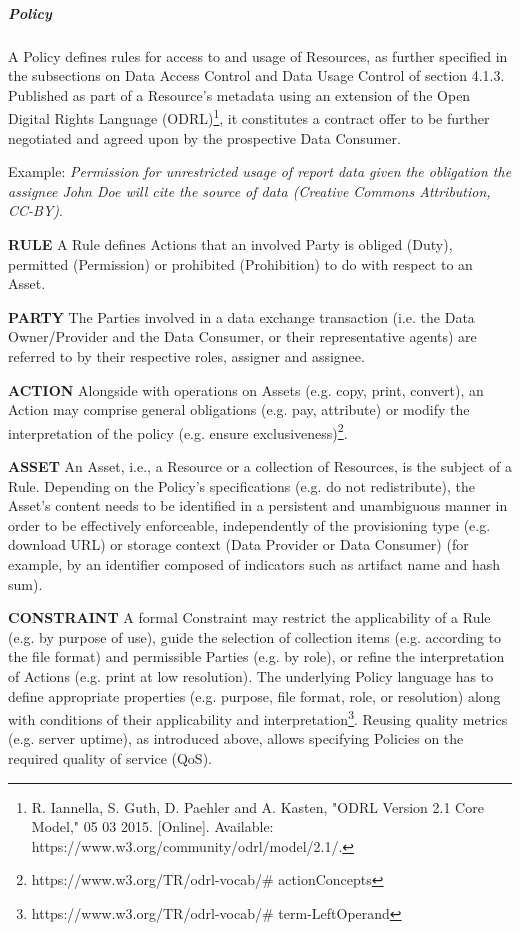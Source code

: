 



\subparagraph*{Policy}
A Policy defines rules for access to and usage of Resources, as further specified in the subsections on Data Access Control and Data Usage Control of section 4.1.3.
Published as part of a Resource’s metadata using an extension of the Open Digital Rights Language (ODRL)\footnote{ R. Iannella, S. Guth, D. Paehler and A. Kasten, "ODRL Version 2.1 Core Model," 05 03 2015. [Online]. Available: https://www.w3.org/community/odrl/model/2.1/.}, it constitutes a contract offer to be further negotiated and agreed upon by the prospective Data Consumer. 

Example: \textit{Permission for unrestricted usage of report data given the obligation the assignee John Doe will cite the source of data (Creative Commons Attribution, CC-BY)}.

\textbf{RULE} A Rule defines Actions that an involved Party is obliged (Duty), permitted (Permission) or prohibited (Prohibition) to do with respect to an Asset.

\textbf{PARTY }The Parties involved in a data exchange transaction (i.e. the Data Owner/Provider and the Data Consumer, or their representative agents) are referred to by their respective roles, assigner and assignee. 

\textbf{ACTION} Alongside with operations on Assets (e.g. copy, print, convert), an Action may comprise general obligations (e.g. pay, attribute) or modify the interpretation of the policy (e.g. ensure exclusiveness)\footnote{https://www.w3.org/TR/odrl-vocab/$\#$ actionConcepts }. 

\textbf{ASSET }An Asset, i.e., a Resource or a collection of Resources, is the subject of a Rule. Depending on the Policy’s specifications (e.g. do not redistribute), the Asset’s content needs to be identified in a persistent and unambiguous manner in order to be effectively enforceable, independently of the provisioning type (e.g. download URL) or storage context (Data Provider or Data Consumer) (for example, by an identifier composed of indicators such as artifact name and hash sum).

\textbf{CONSTRAINT} A formal Constraint may restrict the applicability of a Rule (e.g. by purpose of use), guide the selection of collection items (e.g. according to the file format) and permissible Parties (e.g. by role), or refine the interpretation of Actions (e.g. print at low resolution). The underlying Policy language has to define appropriate properties (e.g. purpose, file format, role, or resolution) along with conditions of their applicability and interpretation\footnote{https://www.w3.org/TR/odrl-vocab/$\#$ term-LeftOperand }. Reusing quality metrics (e.g. server uptime), as introduced above, allows specifying Policies on the required quality of service (QoS). 



